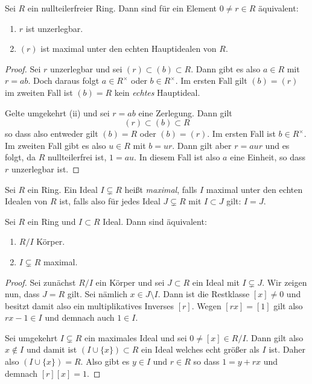 \documentclass{book}
\begin{document}
\begin{prop}
    \label{prop:maximalhaupt}
    Sei $R$ ein nullteilerfreier Ring. Dann sind für ein Element $0 \ne r \in R$ äquivalent:
    \begin{enumerate}[label=(\roman *)]
        \item $r$ ist unzerlegbar.
        \item $(r)$ ist maximal unter den echten Hauptidealen von $R$. 
    \end{enumerate}
\end{prop}
\begin{proof}
    Sei $r$ unzerlegbar und sei $(r) \subset (b) \subset R$. Dann gibt es also
    $a \in R$ mit $r = ab$. Doch daraus folgt $a \in R^{\times}$ oder $b \in
    R^{\times}$. Im ersten Fall gilt $(b) = (r)$ im zweiten Fall ist $(b) = R$
    kein \emph{echtes} Hauptideal. 

    Gelte umgekehrt (ii) und sei $r = ab$ eine Zerlegung. Dann gilt
    \[
        (r) \subset (b) \subset R
    \]
    so dass also entweder gilt $(b) = R$ oder $(b) = (r)$. Im ersten Fall ist
    $b \in R^{\times}$. Im zweiten Fall gibt es also $u \in R$ mit $b = ur$. Dann gilt aber
    $r = aur$ und es folgt, da $R$ nullteilerfrei ist, $1 = au$. In diesem Fall
    ist also $a$ eine Einheit, so dass $r$ unzerlegbar ist. 
\end{proof}

\begin{defi}
    \label{defi:maximalideal}
    Sei $R$ ein Ring. Ein Ideal $I \subsetneq R$ heißt \emph{maximal}, falls
    $I$ maximal unter den echten Idealen von $R$ ist, falls also für jedes
    Ideal $J \subsetneq R$ mit $I \subset J$ gilt: $I = J$. 
\end{defi}

\begin{prop}
    \label{prop:maximalfield}
    Sei $R$ ein Ring und $I \subset R$ Ideal. Dann sind äquivalent:
    \begin{enumerate}[label=(\roman *)]
        \item $R/I$ Körper.
        \item $I \subsetneq R$ maximal.
    \end{enumerate}
\end{prop}
\begin{proof}
    Sei zunächst $R/I$ ein Körper und sei $J \subset R$ ein Ideal mit $I
    \subsetneq J$. Wir zeigen nun, dass $J = R$ gilt. Sei nämlich $x \in J
    \setminus I$. Dann ist die Restklasse $[x] \neq 0$ und besitzt damit also
    ein multiplikatives Inverses $[r]$. Wegen $[rx] = [1]$ gilt also $rx - 1 \in
    I$ und demnach auch $1 \in I$. 

    Sei umgekehrt $I \subsetneq R$ ein maximales Ideal und sei $0 \neq [x] \in
    R/I$. Dann gilt also $x \notin I$ und damit ist $(I \cup \{x\}) \subset R$
    ein Ideal welches echt größer als $I$ ist. Daher also $(I \cup \{x\}) = R$.
    Also gibt es $y \in I$ und $r \in R$ so dass $1 = y + rx$ und demnach
    $[r][x] = 1$.
\end{proof}
\end{document}
